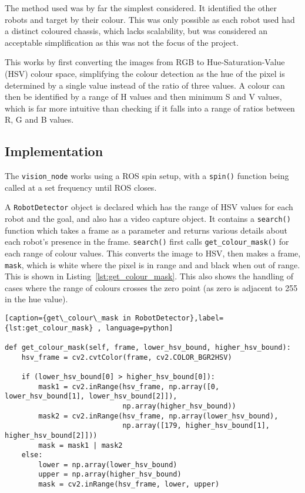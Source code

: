 The method used was by far the simplest considered. It identified the other robots and target
by their colour. This was only possible as each robot used had a distinct coloured chassis,
which lacks scalability, but was considered an acceptable simplification as this was not the
focus of the project.

This works by first converting the images from RGB to Hue-Saturation-Value (HSV) colour space,
simplifying the colour detection as the hue of the pixel is determined by a single value
instead of the ratio of three values. A colour can then be identified by a range of H values
and then minimum S and V values, which is far more intuitive than checking if it falls into a
range of ratios between R, G and B values.

\subsection{Implementation}\label{soft/cv/impl}
The \verb|vision_node| works using a ROS spin setup, with a \verb|spin()| function being
called at a set frequency until ROS closes.

A \verb|RobotDetector| object is declared which has the range of HSV values for each robot
and the goal, and also has a video capture object. It contains a \verb|search()| function which
takes a frame as a parameter and returns various details about each robot's presence in the
frame. \verb|search()| first calls \verb|get_colour_mask()| for each range of colour
values. This converts the image to HSV, then makes a frame, \verb|mask|, which is white where
the pixel is in range and and black when out of range. This is shown in Listing~\ref{lst:get_colour_mask}.
This also shows the handling of cases where the range of colours
crosses the zero point (as zero is adjacent to 255 in the hue value).

\begin{lstlisting}[caption={get\_colour\_mask in RobotDetector},label={lst:get_colour_mask} , language=python]

def get_colour_mask(self, frame, lower_hsv_bound, higher_hsv_bound):
    hsv_frame = cv2.cvtColor(frame, cv2.COLOR_BGR2HSV)

    if (lower_hsv_bound[0] > higher_hsv_bound[0]):
        mask1 = cv2.inRange(hsv_frame, np.array([0, lower_hsv_bound[1], lower_hsv_bound[2]]),
                            np.array(higher_hsv_bound))
        mask2 = cv2.inRange(hsv_frame, np.array(lower_hsv_bound),
                            np.array([179, higher_hsv_bound[1], higher_hsv_bound[2]]))
        mask = mask1 | mask2
    else:
        lower = np.array(lower_hsv_bound)
        upper = np.array(higher_hsv_bound)
        mask = cv2.inRange(hsv_frame, lower, upper)
\end{lstlisting}

